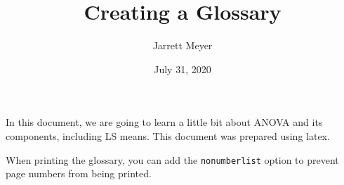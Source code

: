 \documentclass[12pt, letterpaper]{article}
\title{Creating a Glossary}
\author{Jarrett Meyer}
\date{July 31, 2020}
\begin{document}
\maketitle

In this document, we are going to learn a little bit about \gls{ANOVA} and its components, including \gls{LS means}. This document was prepared
using \gls{latex}.

When printing the glossary, you can add the \texttt{nonumberlist} option to prevent page numbers from being printed.

\printglossary[nonumberlist, style=long]
\end{document}
